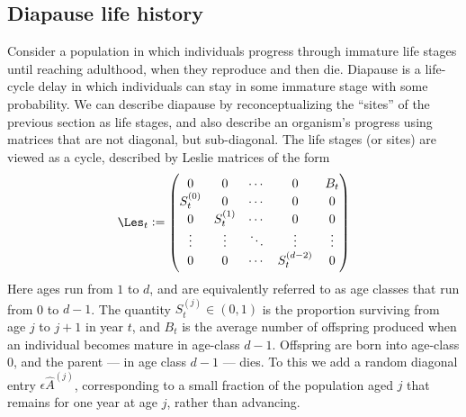 \documentclass[11pt]{amsart}
\begin{document}
\subsection{Diapause life history}  \label{sec:diapause}
Consider a population in which individuals progress through immature life stages until reaching adulthood, when they reproduce and
then die. 
Diapause is a life-cycle delay in which individuals can stay in some immature stage with some probability. We can describe diapause
by reconceptualizing the ``sites'' of the previous section as life stages, and also describe an organism's progress using matrices that are not diagonal, but sub-diagonal. 
The life stages  (or sites) are viewed as a cycle, described by Leslie matrices of the form
$$
\Les_{t}:= 
\begin{pmatrix}
	0&0&\cdots&0&B_{t}\\
	S_{t}^{(0)}&0&\cdots&0&0\\
	0&S_{t}^{(1)}&\cdots&0&0\\
	\vdots&\vdots&\ddots&\vdots&\vdots\\
	0&0&\cdots&S_{t}^{(d-2)}&0
\end{pmatrix}
$$
Here ages run from $1$ to $d$, and are equivalently referred to as age classes that run from 0 to $d-1$. The quantity $S_{t}^{(j)}\in (0,1)$ is the proportion surviving from age $j$ to $j+1$ in year $t$, and $B_{t}$ is the average number of offspring produced when an individual becomes mature in age-class $d-1$.
Offspring are born into age-class 0, and the parent --- in age class $d-1$ --- dies.
To this we add a random diagonal entry $\epsilon \widehat{A}^{(j)}$, corresponding to a small fraction of the population aged $j$ that remains for one year at age $j$, rather than advancing.
\end{document}
